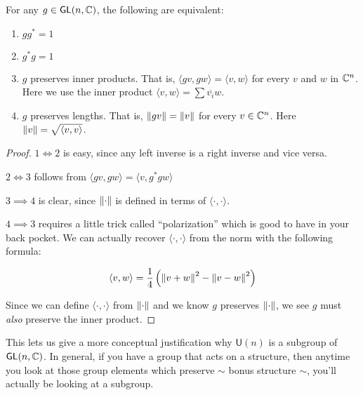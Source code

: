 \documentclass[../main.tex]{subfiles}
\begin{document}

\begin{lemma}
  For any $g \in \mathsf{GL}(n,\mathbb{C})$, the following are equivalent:

  \begin{enumerate}
    \item $g g^* = 1$
    \item $g^* g = 1$
    \item $g$ preserves inner products. That is, 
      $\langle gv, gw \rangle = \langle v, w \rangle$
      for every $v$ and $w$ in $\mathbb{C}^n$. Here we use the
      inner product $\langle v, w \rangle = \sum \overline{v_i} w$.
    \item $g$ preserves lengths. That is,
      $\left \lVert gv \right \rVert = \left \lVert v \right \rVert$ for every $v \in \mathbb{C}^n$. Here
      $\left \lVert v \right \rVert = \sqrt{\langle v, v \rangle}$.
  \end{enumerate}
\end{lemma}

\begin{proof}
  $1 \iff 2$ is easy, since any left inverse is a right inverse and vice versa.

  $2 \iff 3$ follows from $\langle gv, gw \rangle = \langle v, g^* g w \rangle$

  $3 \implies 4$ is clear, since $\left \lVert \cdot \right \rVert$ is defined in terms of $\langle \cdot, \cdot \rangle$.

  $4 \implies 3$ requires a little trick called ``polarization'' which is good to have
  in your back pocket. We can actually recover $\langle \cdot, \cdot \rangle$ 
  from the norm with the following formula:

  \[ \langle v, w \rangle = \frac{1}{4} \left ( \left \lVert v+w \right \rVert^2 - \left \lVert v-w \right \rVert^2 \right ) \]

  Since we can define $\langle \cdot , \cdot \rangle$ from $\left \lVert \cdot \right \rVert$
  and we know $g$ preserves $\left \lVert \cdot \right \rVert$, we see $g$ must \emph{also} preserve
  the inner product.
\end{proof}

This lets us give a more conceptual justification why $\mathsf{U}(n)$ is a
subgroup of $\mathsf{GL}(n,\mathbb{C})$. In general, if you have a group that acts
on a structure, then anytime you look at those group elements which preserve
$\sim$ bonus structure $\sim$, you'll actually be looking at a subgroup.
\end{document}
